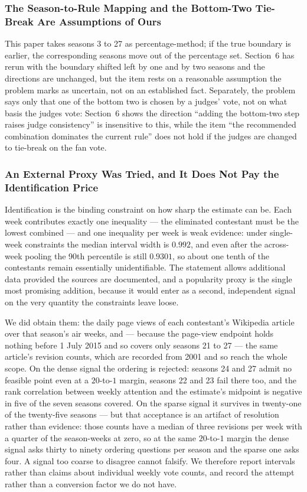 \subsubsection{The Season-to-Rule Mapping and the Bottom-Two Tie-Break Are Assumptions of Ours}
This paper takes seasons 3 to 27 as percentage-method; if the true boundary is earlier, the corresponding seasons move out of the percentage set. Section~6 has rerun with the boundary shifted left by one and by two seasons and the directions are unchanged, but the item rests on a reasonable assumption the problem marks as uncertain, not on an established fact. Separately, the problem says only that one of the bottom two is chosen by a judges' vote, not on what basis the judges vote: Section~6 shows the direction ``adding the bottom-two step raises judge consistency'' is insensitive to this, while the item ``the recommended combination dominates the current rule'' does not hold if the judges are changed to tie-break on the fan vote.

\subsubsection{An External Proxy Was Tried, and It Does Not Pay the Identification Price}
Identification is the binding constraint on how sharp the estimate can be. Each week contributes exactly one inequality --- the eliminated contestant must be the lowest combined --- and one inequality per week is weak evidence: under single-week constraints the median interval width is $0.992$, and even after the across-week pooling the 90th percentile is still $0.9301$, so about one tenth of the contestants remain essentially unidentifiable. The statement allows additional data provided the sources are documented, and a popularity proxy is the single most promising addition, because it would enter as a second, independent signal on the very quantity the constraints leave loose.

We did obtain them: the daily page views of each contestant's Wikipedia article over that season's air weeks, and --- because the page-view endpoint holds nothing before 1 July 2015 and so covers only seasons 21 to 27 --- the same article's revision counts, which are recorded from 2001 and so reach the whole scope. On the dense signal the ordering is rejected: seasons 24 and 27 admit no feasible point even at a $20$-to-$1$ margin, seasons 22 and 23 fail there too, and the rank correlation between weekly attention and the estimate's midpoint is negative in five of the seven seasons covered. On the sparse signal it survives in twenty-one of the twenty-five seasons --- but that acceptance is an artifact of resolution rather than evidence: those counts have a median of three revisions per week with a quarter of the season-weeks at zero, so at the same $20$-to-$1$ margin the dense signal asks thirty to ninety ordering questions per season and the sparse one asks four. A signal too coarse to disagree cannot falsify. We therefore report intervals rather than claims about individual weekly vote counts, and record the attempt rather than a conversion factor we do not have.

